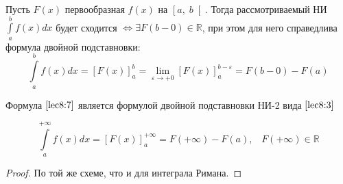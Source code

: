 \documentclass[../../main.tex]{subfiles}
\begin{document}
\begin{thm}
Пусть $F(x)$ первообразная $f(x)$ на $\left[a,\; b\right[$. Тогда рассмотриваемый НИ $\displaystyle\int\limits_{a}^{b}f(x)dx$ будет сходится $\iff \exists F(b-0)\in \mathbb{R}$, при этом для него справедлива формула двойной подставновки:
\begin{equation}\label{lec8:7}
\int\limits_{a}^{b}f(x)dx = \left[F(x)\right]_{a}^{b} = \underset{\varepsilon \to +0}\lim\left[F(x)\right]_{a}^{b - \varepsilon} = F(b - 0) - F(a) 
\end{equation}

Формула $\eqref{lec8:7}$ является формулой двойной подставновки НИ-2 вида $\eqref{lec8:3}$

\begin{equation}\label{lec8:8}
\int\limits_{a}^{+\infty}f(x)dx = \left[F(x)\right]_{a}^{+\infty} = F(+\infty) - F(a), \;\;\; F(+\infty) \in \mathbb{R} 
\end{equation}
\end{thm}

\begin{proof}
По той же схеме, что и для интеграла Римана.
\end{proof}
\end{document}
